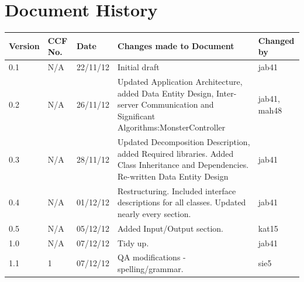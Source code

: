 \documentclass[a4paper]{article}
\begin{document}
\clearpage
\setlength\parindent{0pt}

\tableofcontents


\clearpage


\clearpage


\clearpage


\clearpage


\clearpage


\clearpage


\clearpage


\clearpage


\section{Document History}
\begin{tabular}{| l | l | l | p{9cm} | p{2cm} |}
\hline
Version & CCF No. & Date & Changes made to Document & Changed by \\
\hline
0.1 & N/A & 22/11/12 & Initial draft & jab41\\
\hline
0.2 & N/A & 26/11/12 & Updated Application Architecture, added Data Entity Design, Inter-server Communication and Significant Algorithms:MonsterController & jab41, mah48\\
\hline
0.3 & N/A & 28/11/12 & Updated Decomposition Description, added Required libraries. Added Class Inheritance and Dependencies. Re-written Data Entity Design & jab41\\
\hline
0.4 & N/A & 01/12/12 & Restructuring. Included interface descriptions for all classes. Updated nearly every section. & jab41 \\
\hline
0.5 & N/A & 05/12/12 & Added Input/Output section. & kat15 \\
\hline
1.0 & N/A & 07/12/12 & Tidy up. & jab41 \\
\hline
1.1 & 1 & 07/12/12 & QA modifications - spelling/grammar. & sie5 \\
\hline
\end{tabular}
\end{document}
